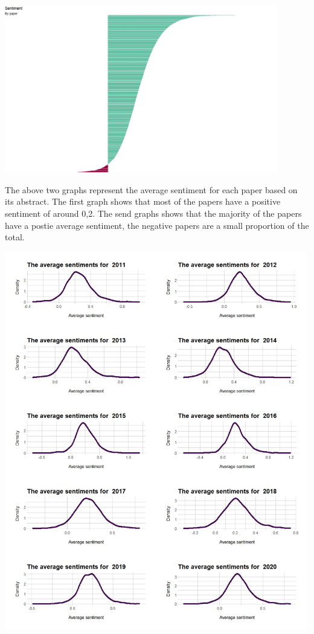 \documentclass[
  letterpaper,
  DIV=11,
  numbers=noendperiod]{scrartcl}
\begin{document}
\includegraphics[width=4.6875in,height=\textheight]{images/sentimentPerPaper.jpg}

The above two graphs represent the average sentiment for each paper
based on its abstract. The first graph shows that most of the papers
have a positive sentiment of around 0,2. The send graphs shows that the
majority of the papers have a postie average sentiment, the negative
papers are a small proportion of the total.

\includegraphics[width=5.20833in,height=\textheight]{images/aveSentimentPerYear.jpg}
\end{document}
